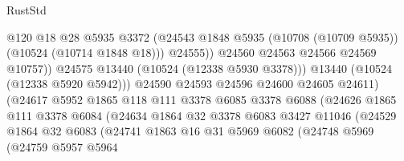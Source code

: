 \begin{lexlean}{RustStd}
\begin{coremodule}
                                        @120
                                        @18
                                        @28
                                        @5935
                                        @3372
                                        (@24543
                                          @1848
                                          @5935
                                          (@10708 (@10709 @5935))
                                          (@10524 (@10714 @1848 @18)))
                                        @24555))
                                    @24560
                                    @24563
                                    @24566
                                    @24569
                                    @10757))
                                @24575
                                @13440
                                (@10524 (@12338 @5930 @3378)))
                              @13440
                              (@10524 (@12338 @5920 @5942)))
                            @24590
                            @24593
                            @24596
                            @24600
                            @24605
                            @24611)
                          (@24617
                            @5952
                            @1865
                            @118
                            @111
                            @3378
                            @6085
                            @3378
                            @6088
                            (@24626
                              @1865
                              @111
                              @3378
                              @6084
                              (@24634
                                @1864
                                @32
                                @3378
                                @6083
                                @3427
                                @11046
                                (@24529
                                  @1864
                                  @32
                                  @6083
                                  (@24741
                                    @1863
                                    @16
                                    @31
                                    @5969
                                    @6082
                                    (@24748
                                      @5969
                                      (@24759
                                        @5957
                                        @5964

\end{coremodule}
\end{lexlean}
